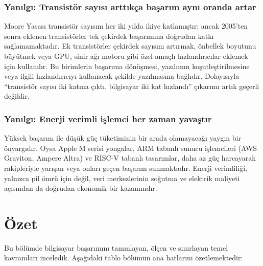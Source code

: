 \subsubsection*{Yanılgı: Transistör sayısı arttıkça başarım aynı oranda artar}
Moore Yasası transistör sayısını her iki yılda ikiye katlamıştır; ancak 2005'ten sonra eklenen transistörler tek çekirdek başarımına doğrudan katkı sağlamamaktadır. Ek transistörler çekirdek sayısını artırmak, önbellek boyutunu büyütmek veya GPU, sinir ağı motoru gibi özel amaçlı hızlandırıcılar eklemek için kullanılır. Bu birimlerin başarıma dönüşmesi, yazılımın koşutleştirilmesine veya ilgili hızlandırıcıyı kullanacak şekilde yazılmasına bağlıdır. Dolayısıyla ``transistör sayısı iki katına çıktı, bilgisayar iki kat hızlandı'' çıkarımı artık geçerli değildir.

\subsubsection*{Yanılgı: Enerji verimli işlemci her zaman yavaştır}
Yüksek başarım ile düşük güç tüketiminin bir arada olamayacağı yaygın bir önyargıdır. Oysa Apple M serisi yongalar, ARM tabanlı sunucu işlemcileri (AWS Graviton, Ampere Altra) ve RISC-V tabanlı tasarımlar, daha az güç harcayarak rakipleriyle yarışan veya onları geçen başarım sunmaktadır. Enerji verimliliği, yalnızca pil ömrü için değil, veri merkezlerinin soğutma ve elektrik maliyeti açısından da doğrudan ekonomik bir kazanımdır.


\section{Özet}
\label{sec:basarim-ozet}

Bu bölümde bilgisayar başarımını tanımlayan, ölçen ve sınırlayan temel kavramları inceledik. Aşağıdaki tablo bölümün ana hatlarını özetlemektedir:

